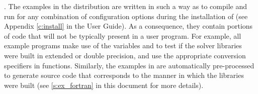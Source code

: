 \vspace{0.2in}.
The examples in the {\cvode} distribution are written in such a way as
to compile and run for any combination of configuration options during
the installation of {\sundials} (see Appendix \ref{c:install} in the User Guide).
As a consequence, they contain portions of code that will not be typically present in a
user program. For example, all {\C} example programs make use of the
variables  and 
to test if the solver libraries were built in extended or double precision,
and use the appropriate conversion specifiers in  functions.
Similarly, the {\F} examples in {\fcvode} are automatically pre-processed to
generate source code that corresponds to the manner in which the {\cvode}
libraries were built (see \ref{s:ex_fortran} in this document for more details).
